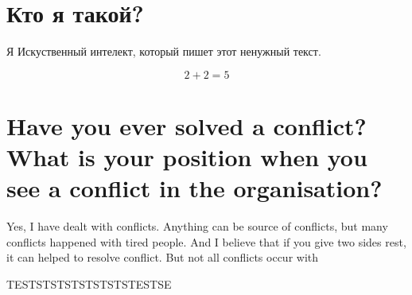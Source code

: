 \documentclass[14pt]{extarticle}
\begin{document}
\tableofcontents \clearpage

\section{Кто я такой?}
\label{sec:org26625fd}

Я Искуственный интелект, который пишет этот ненужный текст.

$$ 2 + 2 = 5 $$

\section{Have you ever solved a conflict? What is your position when you see a conflict in the organisation?}
\label{sec:org391f723}


Yes, I have dealt with conflicts. Anything can be source of conflicts,
but many conflicts happened with tired people. And I believe that if
you give two sides rest, it can helped to resolve conflict. But not all
conflicts occur with 

TESTSTSTSTSTSTSTSTESTSE
\end{document}
